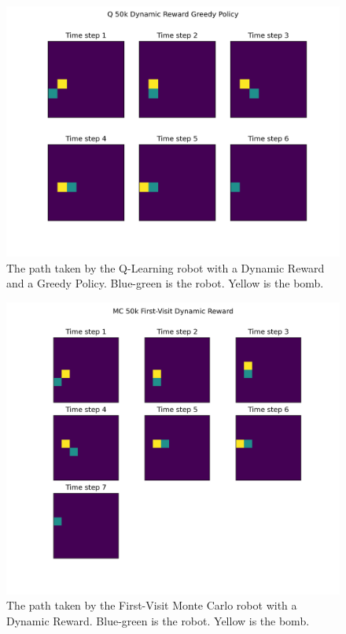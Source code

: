 \documentclass[12pt]{article}
\begin{document}
\begin{figure}
  \includegraphics[width=0.95\linewidth]{Figures/q-50k-dynamic-reward-greedy-policy.png}
  \centering
  \caption{The path taken by the Q-Learning robot with a Dynamic Reward and a Greedy Policy. Blue-green is the robot. Yellow is the bomb.}
  \label{fig:qdg}
\end{figure}

\begin{figure}
  \includegraphics[width=0.95\linewidth]{Figures/mc-50k-first-visit-dynamic-reward.png}
  \centering
  \caption{The path taken by the First-Visit Monte Carlo robot with a Dynamic Reward. Blue-green is the robot. Yellow is the bomb.}
  \label{fig:mcd}
\end{figure}
\end{document}
